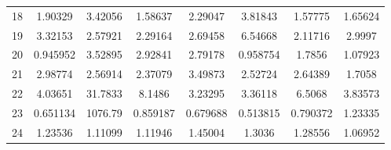 \begin{center}
\begin{longtable}{cccccccc}
18 & 1.90329 & 3.42056 & 1.58637 & 2.29047 & 3.81843 & 1.57775 & 1.65624\\
19 & 3.32153 & 2.57921 & 2.29164 & 2.69458 & 6.54668 & 2.11716 & 2.9997\\
20 & 0.945952 & 3.52895 & 2.92841 & 2.79178 & 0.958754 & 1.7856 & 1.07923\\
21 & 2.98774 & 2.56914 & 2.37079 & 3.49873 & 2.52724 & 2.64389 & 1.7058\\
22 & 4.03651 & 31.7833 & 8.1486 & 3.23295 & 3.36118 & 6.5068 & 3.83573\\
23 & 0.651134 & 1076.79 & 0.859187 & 0.679688 & 0.513815 & 0.790372 & 1.23335\\
24 & 1.23536 & 1.11099 & 1.11946 & 1.45004 & 1.3036 & 1.28556 & 1.06952\\
\end{longtable}
\end{center} 


